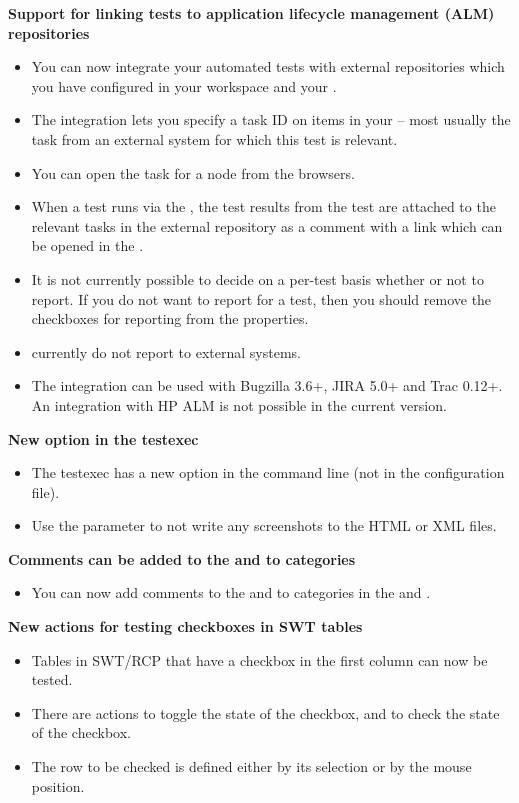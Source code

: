 \textbf{Support for linking tests to application lifecycle management (ALM) repositories}
\begin{itemize}
\item You can now integrate your automated tests with external repositories which you have configured in your workspace and your \gdproject{}.
\item The integration lets you specify a task ID on items in your \gdproject{} -- most usually the task from an external system for which this test is relevant. 
\item You can open the task for a node from the browsers. 
\item When a test runs via the \ite{}, the test results from the test are attached to the relevant tasks in the external repository as a comment with a link which can be opened in the \dash{}.
\item It is not currently possible to decide on a per-test basis whether or not to report. If you do not want to report for a test, then you should remove the checkboxes for reporting from the \gdproject{} properties. 
\item \gdjobs{} currently do not report to external systems. 
\item The integration can be used with Bugzilla 3.6+, JIRA 5.0+ and Trac 0.12+. An integration with HP ALM is not possible in the current version. 
\end{itemize}

\textbf{New option in the testexec}
\begin{itemize}
\item The testexec has a new option in the command line (not in the configuration file).
\item Use the parameter  to not write any screenshots to the HTML or XML files.
\end{itemize}

\textbf{Comments can be added to the \gdproject{} and to categories}
\begin{itemize}
\item You can now add comments to the \gdproject{} and to categories in the \gdtestsuitebrowser{} and \gdtestcasebrowser{}.
\end{itemize}

\textbf{New actions for testing checkboxes in SWT tables}
\begin{itemize}
\item Tables in SWT/RCP \gdauts{} that have a checkbox in the first column can now be tested.
\item There are actions to toggle the state of the checkbox, and to check the state of the checkbox.
\item The row to be checked is defined either by its selection or by the mouse position.
\end{itemize}

